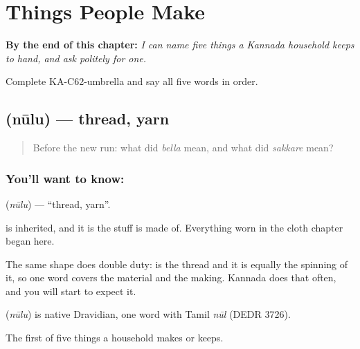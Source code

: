 
\chapter{Things People Make}
\label{ch:ka-made}

\begin{chapteropening}
\textbf{By the end of this chapter:} \emph{I can name five things a Kannada household keeps to hand, and ask politely for one.}

Complete KA-C62-umbrella and say all five words in order.
\end{chapteropening}

\section[\texorpdfstring{\kn{ನೂಲು} (nūlu)}{ನೂಲು (nūlu)}]{ (nūlu) — thread, yarn}

\label{lesson:KA-C62-thread}



\begin{quote}
Before the new run: what did \emph{bella} mean, and what did \emph{sakkare} mean?
\end{quote}

\subsection*{You'll want to know: }
\textbf{} (\emph{nūlu}) — \textquotedblleft{}thread, yarn\textquotedblright{}.

 is inherited, and it is the stuff  is made of. Everything worn in the cloth chapter began here.

The same shape does double duty:  is the thread and it is equally the spinning of it, so one word covers the material and the making. Kannada does that often, and you will start to expect it.

\begin{cousinweb}
\textbf{} (\emph{nūlu}) is native Dravidian, one word with Tamil \emph{nūl} (DEDR 3726).
\end{cousinweb}

\begin{grammarlens}[title={What you've built}]
The first of five things a household makes or keeps.
\end{grammarlens}

